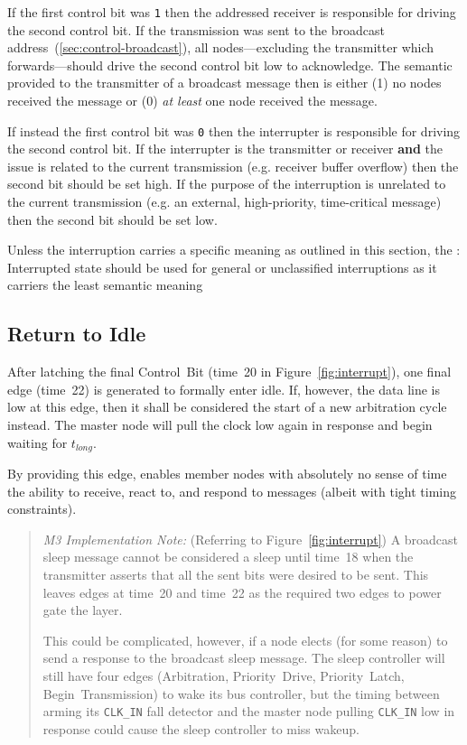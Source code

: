 If the first control bit was {\tt 1} then the addressed receiver is
responsible for driving the second control bit. If the transmission was sent
to the broadcast address~(\ref{sec:control-broadcast}), all nodes---excluding
the transmitter which forwards---should drive the second control bit low to
acknowledge. The semantic provided to the transmitter of a broadcast message
then is either (1) no nodes received the message or (0) {\em at least} one
node received the message.

If instead the first control bit was {\tt 0} then the interrupter is
responsible for driving the second control bit. If the interrupter is the
transmitter or receiver {\bf and} the issue is related to the current
transmission (e.g. receiver buffer overflow) then the second bit should be set
high. If the purpose of the interruption is unrelated to the current
transmission (e.g. an external, high-priority, time-critical message) then the
second bit should be set low.

Unless the interruption carries a specific meaning as outlined in this
section, the {: Interrupted} state should be used for general or
unclassified interruptions as it carriers the least semantic meaning

\subsection{Return to Idle}
\label{sec:protocol-return-idle}
After latching the final Control~Bit (time~20 in
Figure~\ref{fig:interrupt}), one final edge (time~22) is generated to formally
enter {\sc idle}. If, however, the data line is low at this edge, then it
shall be considered the start of a new arbitration cycle instead. The master
node will pull the clock low again in response and begin waiting for
$t_{long}$.

By providing this edge, \bus enables member nodes with absolutely no sense of
time the ability to receive, react to, and respond to messages (albeit with
tight timing constraints).

\begin{quote}
\textit{M3 Implementation Note:} (Referring to
Figure~\ref{fig:interrupt}) A broadcast sleep message cannot be considered a
sleep until time~18 when the transmitter asserts that all the sent bits were
desired to be sent. This leaves edges at time~20 and time~22 as the required
two edges to power gate the layer.

This could be complicated, however, if a node elects (for some reason) to send
a response to the broadcast sleep message. The sleep controller will still
have four edges (Arbitration, Priority~Drive, Priority~Latch,
Begin~Transmission) to wake its bus controller, but the timing between arming
its {\tt CLK\_IN} fall detector and the master node pulling {\tt CLK\_IN} low
in response could cause the sleep controller to miss wakeup.
\end{quote}
